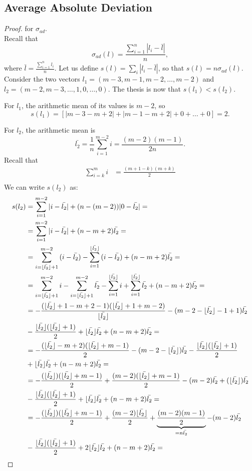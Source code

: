\documentclass[version=3.21, pagesize, twoside=off, bibliography=totoc, DIV=calc, fontsize=12pt, a4paper]{scrartcl}
\begin{document}
\subsection{Average Absolute Deviation}
\begin{proof} for $\sigma_{ad}$. \\
	Recall that 
	\[\sigma_{ad}(l)= \frac{\sum_{i=1}^{n}|l_i-\bar{l}|}{n},\] 
	where $\bar{l}=\frac{\sum_{i=1}^{n}l_i}{n}$.
	Let us define $s(l)= \sum_{i}|l_i-\bar{l}|$, so that $s(l) = n \sigma_{ad}(l)$.
	Consider the two vectors $l_1=(m-3, m-1, m-2, \dots, m-2)$ and $l_2=(m-2, m-3, \dots, 1, 0, \dots, 0)$. The thesis is now that $s(l_1) < s(l_2)$.
	
	For $l_1$, the arithmetic mean of its values is $m-2$, so 
	\[s(l_1)=[|m-3-m+2|+|m-1-m+2|+ 0 + \dots + 0]= 2.\]

	For $l_2$, the arithmetic mean is 
	\[\bar{l_2}=\frac{1}{n}\sum_{i=1}^{m-2}{i}= \frac{(m-2)(m-1)}{2n}.\]
	Recall that 
	\begin{align}
		\sum_{i=k}^{m}{i} &= \frac{(m+1-k)(m+k)}{2} \\
	\end{align}
	We can write $s(l_2)$ as:
	\begin{align}
		s(l_2)&= \sum_{i=1}^{m-2}{|i-\bltwo|}+(n-(m-2))|0-\bltwo|=\\
		&= \sum_{i=1}^{m-2}{|i-\bltwo|}+(n-m+2)\bltwo=\\
		&=\sum_{i=\fltwo+1}^{m-2}{(i-\bltwo)}-\sum_{i=1}^{\fltwo}{(i-\bltwo)} +(n-m+2)\bltwo=\\
		&=\sum_{i=\fltwo+1}^{m-2}{i}-\sum_{i=\fltwo+1}^{m-2}{\bltwo}-\sum_{i=1}^{\fltwo}{i} +\sum_{i=1}^{\fltwo}{\bltwo}+(n-m+2)\bltwo=\\
		&= -\frac{(\fltwo+1-m+2-1)(\fltwo+1+m-2)}{\fltwo}-(m-2-\fltwo-1+1)\bltwo\\ &-\frac{\fltwo(\fltwo+1)}{2}+\fltwo \bltwo + (n-m+2)\bltwo=\\
		&=-\frac{(\fltwo-m+2)(\fltwo+m-1)}{2}-(m-2-\fltwo)\bltwo-\frac{\fltwo(\fltwo+1)}{2} \\
		&+ \fltwo \bltwo + (n-m+2)\bltwo=\\
		&=-\frac{(\fltwo)(\fltwo+m-1)}{2}+\frac{(m-2)(\fltwo+m-1)}{2} -(m-2)\bltwo+(\fltwo)\bltwo \\ &-\frac{\fltwo(\fltwo+1)}{2}+ \fltwo \bltwo + (n-m+2)\bltwo=\\
		&=-\frac{(\fltwo)(\fltwo+m-1)}{2}+\frac{(m-2)\fltwo}{2}+\underbrace{\frac{(m-2)(m-1)}{2}}_{=n \bltwo} -(m-2)\bltwo \\ &-\frac{\fltwo(\fltwo+1)}{2}+ 2\fltwo \bltwo + (n-m+2)\bltwo=\\

\end{align}
\end{proof}
\end{document}
